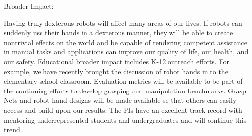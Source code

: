 Broader Impact:

Having truly dexterous robots will affect many areas of our lives.   If robots can suddenly use their hands in a dexterous manner, they will be able to create nontrivial effects on the world and be capable of rendering competent assistance in manual tasks and applications can improve our quality of life, our health, and our safety.     Educational broader impact includes K-12 outreach efforts.  For example, we have recently brought the discussion of robot hands in to the elementary school classroom.    Evaluation metrics will be available to be part of the continuing efforts to develop grasping and manipulation benchmarks.   Grasp Nets and robot hand designs will be made available so that others can easily access and build upon our results.   The PIs have an excellent track record with mentoring underrepresented students and undergraduates and will continue this trend.



